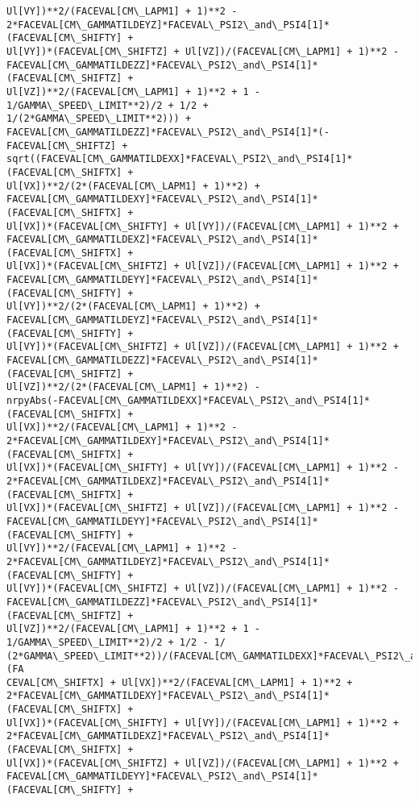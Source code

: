 \documentclass[landscape,letterpaper,10pt,english]{article}
\begin{document}
\begin{Verbatim}[commandchars=\\\{\}]
Ul[VY])**2/(FACEVAL[CM\_LAPM1] + 1)**2 -
2*FACEVAL[CM\_GAMMATILDEYZ]*FACEVAL\_PSI2\_and\_PSI4[1]*(FACEVAL[CM\_SHIFTY] +
Ul[VY])*(FACEVAL[CM\_SHIFTZ] + Ul[VZ])/(FACEVAL[CM\_LAPM1] + 1)**2 -
FACEVAL[CM\_GAMMATILDEZZ]*FACEVAL\_PSI2\_and\_PSI4[1]*(FACEVAL[CM\_SHIFTZ] +
Ul[VZ])**2/(FACEVAL[CM\_LAPM1] + 1)**2 + 1 - 1/GAMMA\_SPEED\_LIMIT**2)/2 + 1/2 +
1/(2*GAMMA\_SPEED\_LIMIT**2))) +
FACEVAL[CM\_GAMMATILDEZZ]*FACEVAL\_PSI2\_and\_PSI4[1]*(-FACEVAL[CM\_SHIFTZ] +
sqrt((FACEVAL[CM\_GAMMATILDEXX]*FACEVAL\_PSI2\_and\_PSI4[1]*(FACEVAL[CM\_SHIFTX] +
Ul[VX])**2/(2*(FACEVAL[CM\_LAPM1] + 1)**2) +
FACEVAL[CM\_GAMMATILDEXY]*FACEVAL\_PSI2\_and\_PSI4[1]*(FACEVAL[CM\_SHIFTX] +
Ul[VX])*(FACEVAL[CM\_SHIFTY] + Ul[VY])/(FACEVAL[CM\_LAPM1] + 1)**2 +
FACEVAL[CM\_GAMMATILDEXZ]*FACEVAL\_PSI2\_and\_PSI4[1]*(FACEVAL[CM\_SHIFTX] +
Ul[VX])*(FACEVAL[CM\_SHIFTZ] + Ul[VZ])/(FACEVAL[CM\_LAPM1] + 1)**2 +
FACEVAL[CM\_GAMMATILDEYY]*FACEVAL\_PSI2\_and\_PSI4[1]*(FACEVAL[CM\_SHIFTY] +
Ul[VY])**2/(2*(FACEVAL[CM\_LAPM1] + 1)**2) +
FACEVAL[CM\_GAMMATILDEYZ]*FACEVAL\_PSI2\_and\_PSI4[1]*(FACEVAL[CM\_SHIFTY] +
Ul[VY])*(FACEVAL[CM\_SHIFTZ] + Ul[VZ])/(FACEVAL[CM\_LAPM1] + 1)**2 +
FACEVAL[CM\_GAMMATILDEZZ]*FACEVAL\_PSI2\_and\_PSI4[1]*(FACEVAL[CM\_SHIFTZ] +
Ul[VZ])**2/(2*(FACEVAL[CM\_LAPM1] + 1)**2) -
nrpyAbs(-FACEVAL[CM\_GAMMATILDEXX]*FACEVAL\_PSI2\_and\_PSI4[1]*(FACEVAL[CM\_SHIFTX] +
Ul[VX])**2/(FACEVAL[CM\_LAPM1] + 1)**2 -
2*FACEVAL[CM\_GAMMATILDEXY]*FACEVAL\_PSI2\_and\_PSI4[1]*(FACEVAL[CM\_SHIFTX] +
Ul[VX])*(FACEVAL[CM\_SHIFTY] + Ul[VY])/(FACEVAL[CM\_LAPM1] + 1)**2 -
2*FACEVAL[CM\_GAMMATILDEXZ]*FACEVAL\_PSI2\_and\_PSI4[1]*(FACEVAL[CM\_SHIFTX] +
Ul[VX])*(FACEVAL[CM\_SHIFTZ] + Ul[VZ])/(FACEVAL[CM\_LAPM1] + 1)**2 -
FACEVAL[CM\_GAMMATILDEYY]*FACEVAL\_PSI2\_and\_PSI4[1]*(FACEVAL[CM\_SHIFTY] +
Ul[VY])**2/(FACEVAL[CM\_LAPM1] + 1)**2 -
2*FACEVAL[CM\_GAMMATILDEYZ]*FACEVAL\_PSI2\_and\_PSI4[1]*(FACEVAL[CM\_SHIFTY] +
Ul[VY])*(FACEVAL[CM\_SHIFTZ] + Ul[VZ])/(FACEVAL[CM\_LAPM1] + 1)**2 -
FACEVAL[CM\_GAMMATILDEZZ]*FACEVAL\_PSI2\_and\_PSI4[1]*(FACEVAL[CM\_SHIFTZ] +
Ul[VZ])**2/(FACEVAL[CM\_LAPM1] + 1)**2 + 1 - 1/GAMMA\_SPEED\_LIMIT**2)/2 + 1/2 - 1/
(2*GAMMA\_SPEED\_LIMIT**2))/(FACEVAL[CM\_GAMMATILDEXX]*FACEVAL\_PSI2\_and\_PSI4[1]*(FA
CEVAL[CM\_SHIFTX] + Ul[VX])**2/(FACEVAL[CM\_LAPM1] + 1)**2 +
2*FACEVAL[CM\_GAMMATILDEXY]*FACEVAL\_PSI2\_and\_PSI4[1]*(FACEVAL[CM\_SHIFTX] +
Ul[VX])*(FACEVAL[CM\_SHIFTY] + Ul[VY])/(FACEVAL[CM\_LAPM1] + 1)**2 +
2*FACEVAL[CM\_GAMMATILDEXZ]*FACEVAL\_PSI2\_and\_PSI4[1]*(FACEVAL[CM\_SHIFTX] +
Ul[VX])*(FACEVAL[CM\_SHIFTZ] + Ul[VZ])/(FACEVAL[CM\_LAPM1] + 1)**2 +
FACEVAL[CM\_GAMMATILDEYY]*FACEVAL\_PSI2\_and\_PSI4[1]*(FACEVAL[CM\_SHIFTY] +

\end{Verbatim}
\end{document}

